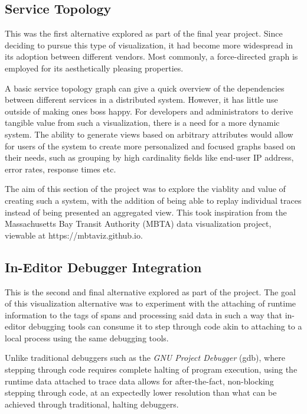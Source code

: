 \documentclass[pdftex,titlepage]{article}
\begin{document}
        \subsection{Service Topology}
        This was the first alternative explored as part of the final year project. Since deciding to pursue this type of visualization,
        it had become more widespread in its adoption between different vendors. Most commonly, a force-directed graph is employed
        for its aesthetically pleasing properties.

        A basic service topology graph can give a quick overview of the dependencies between different services in a distributed
        system. However, it has little use outside of making ones boss happy. For developers and administrators to derive tangible
        value from such a visualization, there is a need for a more dynamic system. The ability to generate views based on arbitrary
        attributes would allow for users of the system to create more personalized and focused graphs based on their needs,
        such as grouping by high cardinality fields like end-user IP address, error rates, response times etc.

        The aim of this section of the project was to explore the viablity and value of creating such a system, with the addition
        of being able to replay individual traces instead of being presented an aggregated view. This took inspiration from the
        Massachusetts Bay Transit Authority (MBTA) data visualization project, viewable at https://mbtaviz.github.io.

        \subsection{In-Editor Debugger Integration}
        This is the second and final alternative explored as part of the project. The goal of this visualization alternative was to
        experiment with the attaching of runtime information to the tags of spans and processing said data in such a way that in-editor
        debugging tools can consume it to step through code akin to attaching to a local process using the same debugging tools.

        Unlike traditional debuggers such as the \textit{GNU Project Debugger} (gdb), where stepping through code requires complete
        halting of program execution, using the runtime data attached to trace data allows for after-the-fact, non-blocking stepping
        through code, at an expectedly lower resolution than what can be achieved through traditional, halting debuggers.
\end{document}
